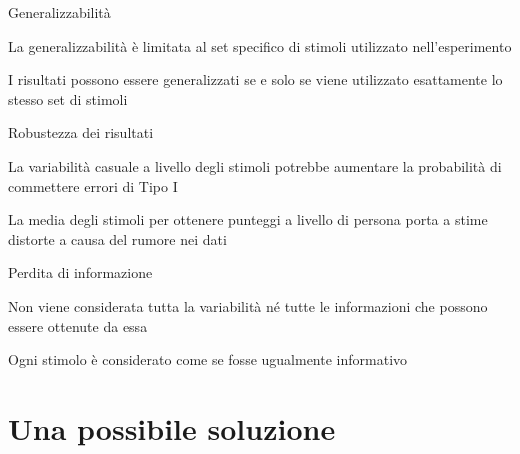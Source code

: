 \documentclass[compress]{beamer}
\begin{document}
\begin{frame}{}
	
	\begin{block}{Generalizzabilità}
		
		\small
		
		La generalizzabilità è limitata al set specifico di stimoli utilizzato nell'esperimento
		
		I risultati possono essere generalizzati se e solo se viene utilizzato esattamente lo stesso set di stimoli
		
		
	\end{block}
	
	\pause
	
	\begin{block}{Robustezza dei risultati}
		
		\small
		La variabilità casuale a livello degli stimoli potrebbe aumentare la probabilità di commettere errori di Tipo I
		
		La media degli stimoli per ottenere punteggi a livello di persona porta a stime distorte a causa del rumore nei dati
	\end{block}
	
	\pause
	
	\begin{block}{Perdita di informazione}
		
		\small
		
		Non viene considerata tutta la variabilità né tutte le informazioni che possono essere ottenute da essa
		
		Ogni stimolo è considerato come se fosse ugualmente informativo
	\end{block}
	
\end{frame}

\section{Una possibile soluzione}
\end{document}
